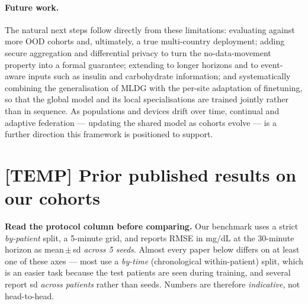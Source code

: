 \documentclass[10pt,letterpaper]{article}
\begin{document}
\paragraph{Future work.} The natural next steps follow directly from these
limitations: evaluating against more OOD cohorts and, ultimately, a true
multi-country deployment; adding secure aggregation and differential privacy to
turn the no-data-movement property into a formal guarantee; extending to longer
horizons and to event-aware inputs such as insulin and carbohydrate information;
and systematically combining the generalisation of MLDG with the per-site
adaptation of finetuning, so that the global model and its local specialisations
are trained jointly rather than in sequence. As populations and devices drift over
time, continual and adaptive federation --- updating the shared model as cohorts
evolve --- is a further direction this framework is positioned to support.

\clearpage
\section*{[TEMP] Prior published results on our cohorts}

\textbf{Read the protocol column before comparing.} Our benchmark uses a strict
\emph{by-patient} split, a 5-minute grid, and reports RMSE in mg/dL at the
30-minute horizon as mean\,$\pm$\,sd \emph{across 5 seeds}. Almost every paper
below differs on at least one of these axes --- most use a \emph{by-time}
(chronological within-patient) split, which is an easier task because the test
patients are seen during training, and several report sd \emph{across patients}
rather than seeds. Numbers are therefore \emph{indicative}, not head-to-head.
\end{document}
